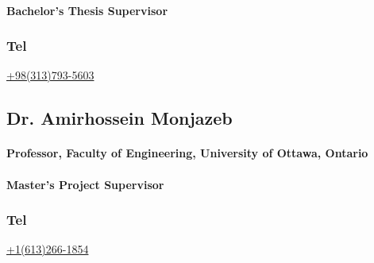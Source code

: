 \documentclass[a4paper]{article}
\begin{document}
\paragraph{\bfseries Bachelor's Thesis Supervisor}

{\large\subsubsection{Tel} {\href{tel:+983137935603}{+98(313)793-5603}}}

\Large\href{mailto:h.karimpour@eng.ui.ac.ir}{}
\Large\href{http://eng.ui.ac.ir/~h.karimpour}{}
\Large\href{https://www.linkedin.com/in/hossein-karimpour-38373811a}{}

\subsection{Dr. Amirhossein Monjazeb}
\paragraph{\bfseries Professor, Faculty of Engineering, University of Ottawa, Ontario}
\paragraph{\bfseries Master's Project Supervisor}

{\large\subsubsection{Tel} {\href{tel:+16132661854}{+1(613)266-1854}}}

\Large\href{mailto:amirhossein.monjazeb@uottawa.ca}{}
\Large\href{https://uniweb.uottawa.ca/members/5272/profile}{}
\Large\href{https://www.linkedin.com/in/amirhossein-monjazeb-0041625b/?originalSubdomain=ca}{}
    

        

        
\end{document}
